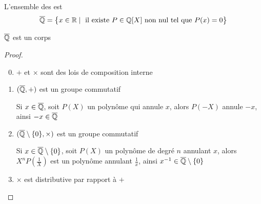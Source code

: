 \begin{frame}
L'ensemble des  est
$$\overline{\mathbb{Q}} = \big\{ x \in \mathbb{R} \mid \text{ il existe } P \in \mathbb{Q}[X] \text{ non nul tel que } P(x)=0\big\}$$

\pause

\begin{proposition}
$\overline{\mathbb{Q}}$ est un corps
\end{proposition}

\pause

\begin{proof}
\vspace*{-1ex}
 \begin{enumerate}
  \setcounter{enumi}{-1}
  \item $+$ et $\times$ sont des lois de composition interne 
  
\pause

  \item $(\overline{\mathbb{Q}},+)$ est un groupe commutatif

\pause

  Si $x\in \overline{\mathbb{Q}}$, soit $P(X)$ un polynôme qui annule $x$, alors $P(-X)$ annule $-x$,
  ainsi $-x \in \overline{\mathbb{Q}}$
   

\pause

  \item $(\overline{\mathbb{Q}}\setminus\{0\},\times)$ est un groupe commutatif

\pause
  Si $x\in \overline{\mathbb{Q}}\setminus\{0\}$, soit $P(X)$ un polynôme de degré $n$ annulant $x$, alors 
      $X^nP(\frac{1}{X})$ est un polynôme annulant $\frac 1 x$, ainsi $x^{-1} \in \overline{\mathbb{Q}}\setminus\{0\}$
  
\pause
    
  \item $\times$ est distributive par rapport à $+$ \qedhere
 \end{enumerate}
\end{proof}

\end{frame}


